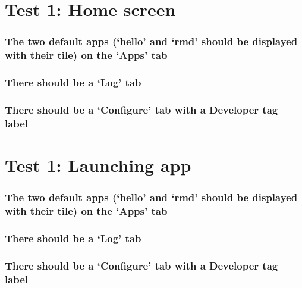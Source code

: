\documentclass[]{article}
\begin{document}
\section{Test 1: Home screen}\label{test-1-home-screen}

\subsubsection{\texorpdfstring{The two default apps (`hello' and `rmd'
should be displayed with their tile) on the `Apps'
tab}{The two default apps (hello and rmd should be displayed with their tile) on the Apps tab}}\label{the-two-default-apps-hello-and-rmd-should-be-displayed-with-their-tile-on-the-apps-tab}

\subsubsection{\texorpdfstring{There should be a `Log'
tab}{There should be a Log tab}}\label{there-should-be-a-log-tab}

\subsubsection{\texorpdfstring{There should be a `Configure' tab with a
Developer tag
label}{There should be a Configure tab with a Developer tag label}}\label{there-should-be-a-configure-tab-with-a-developer-tag-label}

\section{Test 1: Launching app}\label{test-1-launching-app}

\subsubsection{\texorpdfstring{The two default apps (`hello' and `rmd'
should be displayed with their tile) on the `Apps'
tab}{The two default apps (hello and rmd should be displayed with their tile) on the Apps tab}}\label{the-two-default-apps-hello-and-rmd-should-be-displayed-with-their-tile-on-the-apps-tab-1}

\subsubsection{\texorpdfstring{There should be a `Log'
tab}{There should be a Log tab}}\label{there-should-be-a-log-tab-1}

\subsubsection{\texorpdfstring{There should be a `Configure' tab with a
Developer tag
label}{There should be a Configure tab with a Developer tag label}}\label{there-should-be-a-configure-tab-with-a-developer-tag-label-1}
\end{document}
